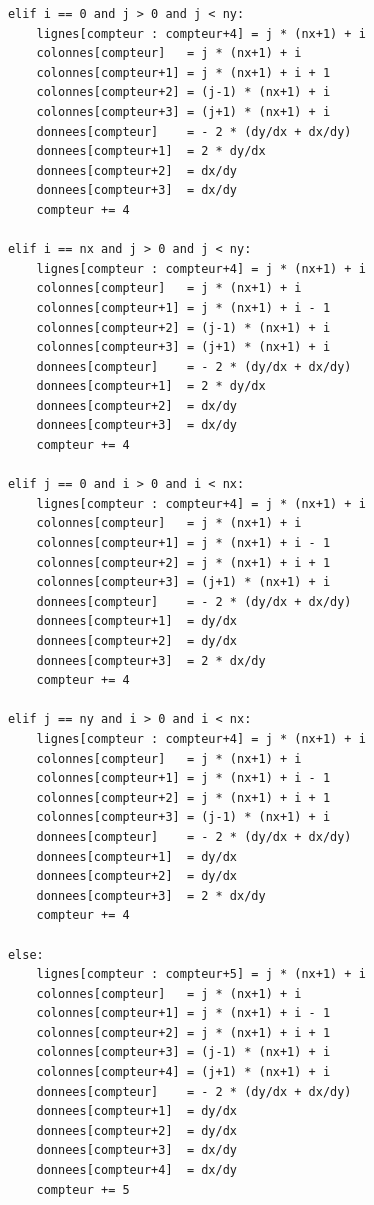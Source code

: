 \begin{verbatim}
            elif i == 0 and j > 0 and j < ny:
                lignes[compteur : compteur+4] = j * (nx+1) + i
                colonnes[compteur]   = j * (nx+1) + i
                colonnes[compteur+1] = j * (nx+1) + i + 1
                colonnes[compteur+2] = (j-1) * (nx+1) + i
                colonnes[compteur+3] = (j+1) * (nx+1) + i
                donnees[compteur]    = - 2 * (dy/dx + dx/dy)
                donnees[compteur+1]  = 2 * dy/dx
                donnees[compteur+2]  = dx/dy
                donnees[compteur+3]  = dx/dy
                compteur += 4

            elif i == nx and j > 0 and j < ny:
                lignes[compteur : compteur+4] = j * (nx+1) + i
                colonnes[compteur]   = j * (nx+1) + i
                colonnes[compteur+1] = j * (nx+1) + i - 1
                colonnes[compteur+2] = (j-1) * (nx+1) + i
                colonnes[compteur+3] = (j+1) * (nx+1) + i
                donnees[compteur]    = - 2 * (dy/dx + dx/dy)
                donnees[compteur+1]  = 2 * dy/dx
                donnees[compteur+2]  = dx/dy
                donnees[compteur+3]  = dx/dy
                compteur += 4

            elif j == 0 and i > 0 and i < nx:
                lignes[compteur : compteur+4] = j * (nx+1) + i
                colonnes[compteur]   = j * (nx+1) + i
                colonnes[compteur+1] = j * (nx+1) + i - 1
                colonnes[compteur+2] = j * (nx+1) + i + 1
                colonnes[compteur+3] = (j+1) * (nx+1) + i
                donnees[compteur]    = - 2 * (dy/dx + dx/dy)
                donnees[compteur+1]  = dy/dx
                donnees[compteur+2]  = dy/dx
                donnees[compteur+3]  = 2 * dx/dy
                compteur += 4

            elif j == ny and i > 0 and i < nx:
                lignes[compteur : compteur+4] = j * (nx+1) + i
                colonnes[compteur]   = j * (nx+1) + i
                colonnes[compteur+1] = j * (nx+1) + i - 1
                colonnes[compteur+2] = j * (nx+1) + i + 1
                colonnes[compteur+3] = (j-1) * (nx+1) + i
                donnees[compteur]    = - 2 * (dy/dx + dx/dy)
                donnees[compteur+1]  = dy/dx
                donnees[compteur+2]  = dy/dx
                donnees[compteur+3]  = 2 * dx/dy
                compteur += 4

            else:
                lignes[compteur : compteur+5] = j * (nx+1) + i
                colonnes[compteur]   = j * (nx+1) + i
                colonnes[compteur+1] = j * (nx+1) + i - 1
                colonnes[compteur+2] = j * (nx+1) + i + 1
                colonnes[compteur+3] = (j-1) * (nx+1) + i
                colonnes[compteur+4] = (j+1) * (nx+1) + i
                donnees[compteur]    = - 2 * (dy/dx + dx/dy)
                donnees[compteur+1]  = dy/dx
                donnees[compteur+2]  = dy/dx
                donnees[compteur+3]  = dx/dy
                donnees[compteur+4]  = dx/dy
                compteur += 5
    

\end{verbatim}
